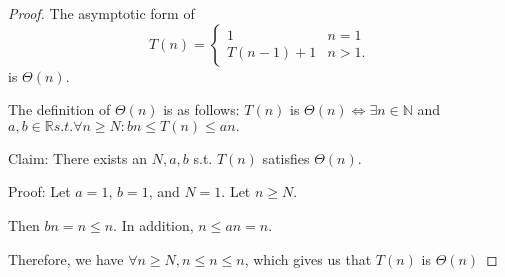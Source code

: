 \documentclass{article}
\begin{document}
\begin{proof}
The asymptotic form of $$T(n) = \begin{cases}
            1        & n=1\\
            T(n-1)+1 & n>1.
         \end{cases}
$$ is $\Theta(n)$. 

The definition of $\Theta(n)$ is as follows: $T(n)$ is $\Theta(n) \Leftrightarrow \exists  n \in \mathbb{N}$ and $a, b \in \mathbb{R} s.t. \forall n \geq N: bn \leq T(n) \leq an.$ 

Claim: There exists an $N, a, b$ s.t. $T(n)$ satisfies $\Theta(n)$.

Proof: Let $a = 1$, $b = 1$, and $N = 1$. Let $n \geq N$. 

Then $bn = n \leq n.$ In addition, $n \leq an = n$. 

Therefore,  we have $\forall n \geq N, n \leq n \leq n$, which gives us that $T(n)$ is $\Theta(n)$
\end{proof}

\end{document}
